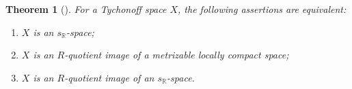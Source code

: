 \documentclass[preprint,11pt]{elsarticle}
\newtheorem{theorem}{Theorem}[section]
\newtheorem{proposition}[theorem]{Proposition}
\numberwithin{equation}{section}
\numberwithin{theorem}{section}
\newcommand{\IR}{\mathbb{R}}
\begin{document}
\begin{theorem}[{\protect\cite[Theorem~7.1]{GR-kR-sR}}] \label{t:characterization-sR}
For a Tychonoff space $X$, the following assertions are equivalent:
\begin{enumerate}
\item[{\rm(i)}] $X$ is an $s_\IR$-space;
\item[{\rm(ii)}]  $X$ is an $R$-quotient image  of a metrizable locally compact space;
\item[{\rm(iii)}]  $X$ is an $R$-quotient  image of an $s_\IR$-space.
\end{enumerate}
\end{theorem}










\end{document}
